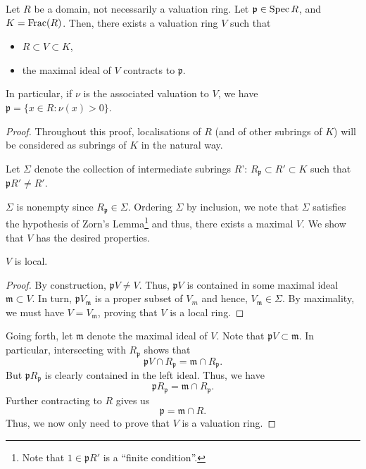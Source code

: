 \documentclass[12pt]{article}
\begin{document}
\begin{thm}
	Let $R$ be a domain, not necessarily a valuation ring. \newline
	Let $\mathfrak{p} \in \operatorname{Spec} R$, and $K = \operatorname{Frac}(R)$. \newline
	Then, there exists a valuation ring $V$ such that
	\begin{itemize}
		\item $R \subset V \subset K$,
		\item the maximal ideal of $V$ contracts to $\mathfrak{p}$.
	\end{itemize}
	In particular, if $\nu$ is the associated valuation to $V$, we have $\mathfrak{p} = \{x \in R : \nu(x) > 0\}$.
\end{thm}
\begin{proof} 
	Throughout this proof, localisations of $R$ (and of other subrings of $K$) will be considered as subrings of $K$ in the natural way.

	Let $\Sigma$ denote the collection of intermediate subrings $R$': $R_{\mathfrak{p}} \subset R' \subset K$ such that $\mathfrak{p} R' \neq R'$. 

	$\Sigma$ is nonempty since $R_{\mathfrak{p}} \in \Sigma$. Ordering $\Sigma$ by inclusion, we note that $\Sigma$ satisfies the hypothesis of Zorn's Lemma\footnote{Note that $1 \in \mathfrak{p}R'$ is a ``finite condition''.} and thus, there exists a maximal $V$. We show that $V$ has the desired properties.

	 $V$ is local. 
	\begin{proof} 
		By construction, $\mathfrak{p}V \neq V$. Thus, $\mathfrak{p}V$ is contained in some maximal ideal $\mathfrak{m} \subset V$. In turn, $\mathfrak{p} V_{\mathfrak{m}}$ is a proper subset of $V_{m}$ and hence, $V_{\mathfrak{m}} \in \Sigma$. By maximality, we must have $V = V_{\mathfrak{m}}$, proving that $V$ is a local ring.
	\end{proof}

	Going forth, let $\mathfrak{m}$ denote the maximal ideal of $V$. Note that $\mathfrak{p} V \subset \mathfrak{m}$. In particular, intersecting with $R_{\mathfrak{p}}$ shows that
	\begin{equation*} 
		\mathfrak{p} V \cap R_{\mathfrak{p}} = \mathfrak{m} \cap R_{\mathfrak{p}}.
	\end{equation*}
	But $\mathfrak{p} R_{\mathfrak{p}}$ is clearly contained in the left ideal. Thus, we have
	\begin{equation*} 
		\mathfrak{p} R_{\mathfrak{p}} = \mathfrak{m} \cap R_{\mathfrak{p}}.
	\end{equation*}
	Further contracting to $R$ gives us
	\begin{equation*} 
		\mathfrak{p} = \mathfrak{m} \cap R.
	\end{equation*}
	Thus, we now only need to prove that $V$ is a valuation ring.


\end{proof}
\end{document}
